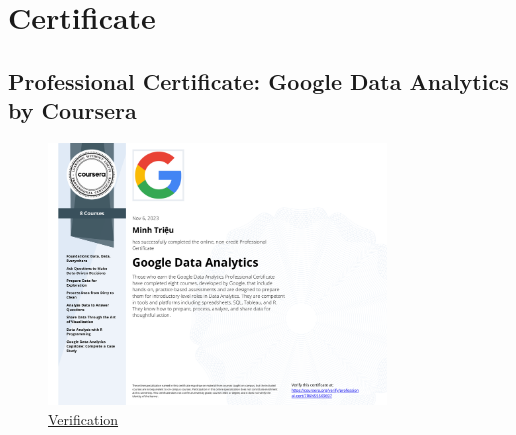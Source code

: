 \documentclass[]{article}
\begin{document}
\setlength{\parskip}{.7em}
\tableofcontents
\newpage

\setlength{\parskip}{.5em}
\newpage


\section{Certificate}
\subsection{Professional Certificate: Google Data Analytics by Coursera}
\begin{figure}[!h]
  \includegraphics[width=0.8\textwidth]{certs/7R6NS55X9697.pdf}
  \caption{\href{https://www.coursera.org/account/accomplishments/specialization/certificate/7R6NS55X9697}{Verification}}
\end{figure}
\end{document}
